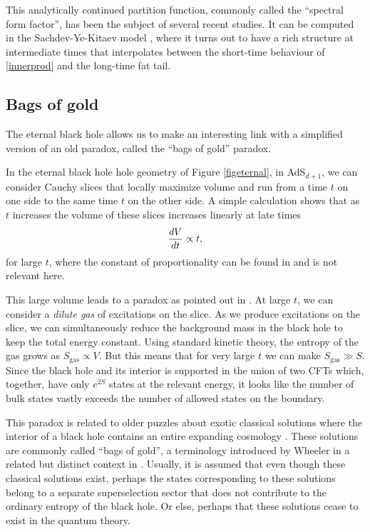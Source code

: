 \documentclass[12pt]{article}
\newcommand{\be}{\begin{equation}}
\newcommand{\ee}{\end{equation}}
\begin{document}
This analytically continued partition function, commonly called the ``spectral form factor'', has been the subject of several recent studies. It can be computed in the Sachdev-Ye-Kitaev model \cite{Cotler:2016fpe,Sonner:2017hxc},  where it turns out to have a rich structure at intermediate times that interpolates between the short-time behaviour of \eqref{innerprod} and the long-time fat tail. 


\subsection{Bags of gold}

The eternal black hole allows us to make an interesting link with a simplified version of an old paradox, called the ``bags of gold'' paradox.

In the eternal black hole hole geometry of Figure \ref{figeternal}, in AdS$_{d+1}$, we can consider Cauchy slices that locally maximize volume and run from a time $t$ on one side to the same time $t$ on the other side. A simple calculation  shows that as $t$ increases the volume of these slices increases linearly at late times 
\be
{d V \over d t} \propto t,
\ee
for large $t$, where the constant of proportionality can be found in \cite{Hartman:2013qma} and is not relevant here.

This large volume leads to a paradox as pointed out in \cite{Mathur:2014dia}. At large $t$, we can consider a {\em dilute gas} of excitations on the slice.  As we produce excitations on the slice, we can simultaneously reduce the background mass in the black hole to keep the total energy constant. Using standard kinetic theory, the entropy of the gas grows as $S_{\text{gas}} \propto V$. But this means that for very large $t$ we can make $S_{\text{gas}} \gg S$. Since the black hole and its interior is supported in the union of two CFTs which, together, have only $e^{2 S}$ states at the relevant energy, it looks like the number of bulk states vastly exceeds the number of allowed states on the boundary.

This paradox is related to older puzzles about exotic classical solutions where the interior of a black hole contains an entire expanding cosmology \cite{Marolf:2008tx,Hsu:2008yi}. These solutions are commonly called ``bags of gold'', a terminology introduced by  Wheeler in a related but distinct context in \cite{wheeler1964relativity}. Usually, it is assumed that even though these classical solutions exist,  perhaps the states corresponding to these solutions belong to a separate superselection sector that does not contribute to the ordinary entropy of the black hole. Or else, perhaps that these solutions cease to exist in the quantum theory.
\end{document}
